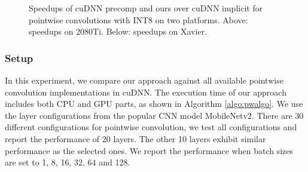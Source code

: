 \begin{figure}
\captionsetup[subfloat]{labelformat=empty,skip=0pt}

	\centering
	\vspace{-5mm}
	\vspace{-6mm}
	\caption{Speedups of cuDNN precomp and ours over cuDNN implicit for pointwise convolutions with INT8 on two platforms. Above: speedups on 2080Ti. Below: speedups on Xavier.}
	\label{fig:pwspeedupint8}
\end{figure}

%	


\subsubsection{Setup} In this experiment, we compare our approach against all available pointwise convolution implementations in cuDNN.
The execution time of our approach includes both CPU and GPU parts, as shown in Algorithm \ref{algo:pwalgo}.
We use the layer configurations from the popular CNN model MobileNetv2.
There are 30 different configurations for pointwise convolution, we test all configurations and report the performance of 20 layers. 
The other 10 layers exhibit similar performance as the selected ones.  
We report the performance when batch sizes are set to 1, 8, 16, 32, 64 and 128.


